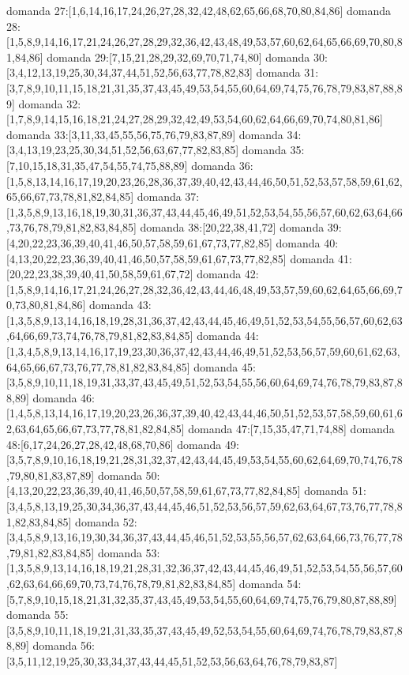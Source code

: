 domanda 27:[1,6,14,16,17,24,26,27,28,32,42,48,62,65,66,68,70,80,84,86]
domanda 28:[1,5,8,9,14,16,17,21,24,26,27,28,29,32,36,42,43,48,49,53,57,60,62,64,65,66,69,70,80,81,84,86]
domanda 29:[7,15,21,28,29,32,69,70,71,74,80]
domanda 30:[3,4,12,13,19,25,30,34,37,44,51,52,56,63,77,78,82,83]
domanda 31:[3,7,8,9,10,11,15,18,21,31,35,37,43,45,49,53,54,55,60,64,69,74,75,76,78,79,83,87,88,89]
domanda 32:[1,7,8,9,14,15,16,18,21,24,27,28,29,32,42,49,53,54,60,62,64,66,69,70,74,80,81,86]
domanda 33:[3,11,33,45,55,56,75,76,79,83,87,89]
domanda 34:[3,4,13,19,23,25,30,34,51,52,56,63,67,77,82,83,85]
domanda 35:[7,10,15,18,31,35,47,54,55,74,75,88,89]
domanda 36:[1,5,8,13,14,16,17,19,20,23,26,28,36,37,39,40,42,43,44,46,50,51,52,53,57,58,59,61,62,65,66,67,73,78,81,82,84,85]
domanda 37:[1,3,5,8,9,13,16,18,19,30,31,36,37,43,44,45,46,49,51,52,53,54,55,56,57,60,62,63,64,66,73,76,78,79,81,82,83,84,85]
domanda 38:[20,22,38,41,72]
domanda 39:[4,20,22,23,36,39,40,41,46,50,57,58,59,61,67,73,77,82,85]
domanda 40:[4,13,20,22,23,36,39,40,41,46,50,57,58,59,61,67,73,77,82,85]
domanda 41:[20,22,23,38,39,40,41,50,58,59,61,67,72]
domanda 42:[1,5,8,9,14,16,17,21,24,26,27,28,32,36,42,43,44,46,48,49,53,57,59,60,62,64,65,66,69,70,73,80,81,84,86]
domanda 43:[1,3,5,8,9,13,14,16,18,19,28,31,36,37,42,43,44,45,46,49,51,52,53,54,55,56,57,60,62,63,64,66,69,73,74,76,78,79,81,82,83,84,85]
domanda 44:[1,3,4,5,8,9,13,14,16,17,19,23,30,36,37,42,43,44,46,49,51,52,53,56,57,59,60,61,62,63,64,65,66,67,73,76,77,78,81,82,83,84,85]
domanda 45:[3,5,8,9,10,11,18,19,31,33,37,43,45,49,51,52,53,54,55,56,60,64,69,74,76,78,79,83,87,88,89]
domanda 46:[1,4,5,8,13,14,16,17,19,20,23,26,36,37,39,40,42,43,44,46,50,51,52,53,57,58,59,60,61,62,63,64,65,66,67,73,77,78,81,82,84,85]
domanda 47:[7,15,35,47,71,74,88]
domanda 48:[6,17,24,26,27,28,42,48,68,70,86]
domanda 49:[3,5,7,8,9,10,16,18,19,21,28,31,32,37,42,43,44,45,49,53,54,55,60,62,64,69,70,74,76,78,79,80,81,83,87,89]
domanda 50:[4,13,20,22,23,36,39,40,41,46,50,57,58,59,61,67,73,77,82,84,85]
domanda 51:[3,4,5,8,13,19,25,30,34,36,37,43,44,45,46,51,52,53,56,57,59,62,63,64,67,73,76,77,78,81,82,83,84,85]
domanda 52:[3,4,5,8,9,13,16,19,30,34,36,37,43,44,45,46,51,52,53,55,56,57,62,63,64,66,73,76,77,78,79,81,82,83,84,85]
domanda 53:[1,3,5,8,9,13,14,16,18,19,21,28,31,32,36,37,42,43,44,45,46,49,51,52,53,54,55,56,57,60,62,63,64,66,69,70,73,74,76,78,79,81,82,83,84,85]
domanda 54:[5,7,8,9,10,15,18,21,31,32,35,37,43,45,49,53,54,55,60,64,69,74,75,76,79,80,87,88,89]
domanda 55:[3,5,8,9,10,11,18,19,21,31,33,35,37,43,45,49,52,53,54,55,60,64,69,74,76,78,79,83,87,88,89]
domanda 56:[3,5,11,12,19,25,30,33,34,37,43,44,45,51,52,53,56,63,64,76,78,79,83,87]
